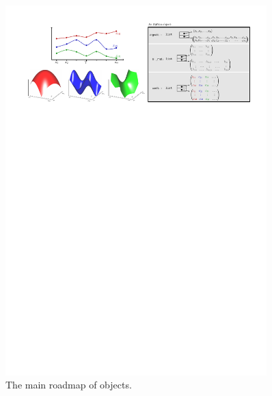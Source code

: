 \begin{figure}[ht]
	\centering
	\includegraphics[page=1,width=0.9\textwidth]{figures/fts.pdf}
	\caption{The main roadmap of  objects.  }
	\label{fig:fts}
\end{figure}

